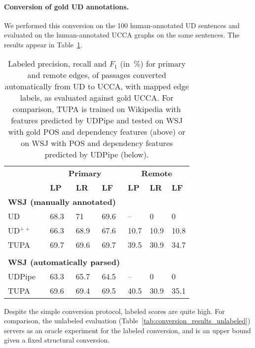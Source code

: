 \documentclass[11pt,a4paper]{article}
\begin{document}
\paragraph{Conversion of gold UD annotations.}

We performed this conversion on the 100 human-annotated UD sentences
and evaluated on the human-annotated UCCA graphs on the same sentences.
The results appear in Table~\ref{tab:conversion_results_labeled}.

\begin{table}[t]
\centering
\begin{tabular}{l|lll|lll}
& \multicolumn{3}{c|}{\footnotesize \bf Primary} & \multicolumn{3}{c}{\footnotesize \bf Remote} \\
& \footnotesize \textbf{LP} & \footnotesize \textbf{LR} & \footnotesize \textbf{LF}
& \footnotesize \textbf{LP} & \footnotesize \textbf{LR} & \footnotesize \textbf{LF} \\
\hline
\multicolumn{4}{l|}{\small \bf WSJ (manually annotated)} & \\
\footnotesize UD
& 68.3 & 71 & 69.6 & -- & 0 & 0 \\
\footnotesize UD$^{++}$
& 66.3 & 68.9 & 67.6 & 10.7 & 10.9 & 10.8 \\
\footnotesize TUPA
& 69.7 & 69.6 & 69.7 & 39.5 & 30.9 & 34.7 \\
\\
\multicolumn{4}{l|}{\small \bf WSJ (automatically parsed)} & \\
UDPipe & 63.3 & 65.7 & 64.5 & -- & 0 & 0 \\
\footnotesize TUPA
& 69.6 & 69.4 & 69.5 & 40.5 & 30.9 & 35.1
\end{tabular}
\caption{
Labeled precision, recall and $F_1$ (in~\%) for primary and remote edges,
of passages converted automatically from UD to UCCA,
with mapped edge labels, as evaluated against gold UCCA.
For comparison, TUPA \protect\cite{hershcovich2017a} is trained on Wikipedia with features predicted by UDPipe
and tested on WSJ with gold POS and dependency features (above)
or on WSJ with POS and dependency features predicted by UDPipe (below).
\label{tab:conversion_results_labeled}}
\end{table}

Despite the simple conversion protocol, labeled scores are quite high.
For comparison, the unlabeled evaluation (Table~\ref{tab:conversion_results_unlabeled})
servers as an oracle experiment for the labeled conversion,
and is an upper bound given a fixed structural conversion.
\end{document}
